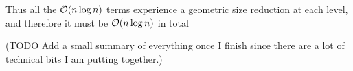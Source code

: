     Thus all the $\mathcal O(n \log n)$ terms experience a geometric size reduction at each level, and therefore it must be $\mathcal O(n \log n)$ in total


(TODO Add a small summary of everything once I finish since there are a lot of technical bits I am putting together.)

\newpage







